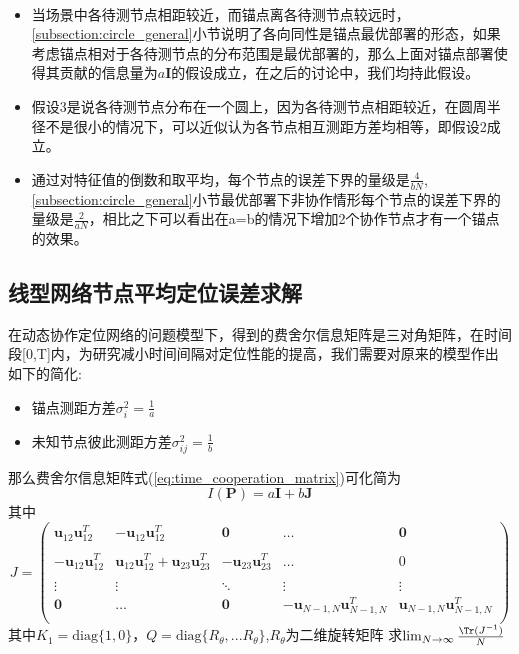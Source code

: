 \begin{remark}
~\\
\begin{itemize}
  \item 当场景中各待测节点相距较近，而锚点离各待测节点较远时，\ref{subsection:circle_general}小节说明了各向同性是锚点最优部署的形态，如果考虑锚点相对于各待测节点的分布范围是最优部署的，那么上面对锚点部署使得其贡献的信息量为$a\bm{I}$的假设成立，在之后的讨论中，我们均持此假设。
  \item 假设3是说各待测节点分布在一个圆上，因为各待测节点相距较近，在圆周半径不是很小的情况下，可以近似认为各节点相互测距方差均相等，即假设2成立。
  \item 通过对特征值的倒数和取平均，每个节点的误差下界的量级是$\frac{4}{bN}$,\ref{subsection:circle_general}小节最优部署下非协作情形每个节点的误差下界的量级是$\frac{2}{aN}$，相比之下可以看出在a=b的情况下增加2个协作节点才有一个锚点的效果。
\end{itemize}

\end{remark}
\subsection{线型网络节点平均定位误差求解}\label{subsection:linear_network}
在动态协作定位网络的问题模型下，得到的费舍尔信息矩阵是三对角矩阵，在时间段[0,T]内，为研究减小时间间隔对定位性能的提高，我们需要对原来的模型作出如下的简化:
\begin{itemize}
\item 锚点测距方差$\sigma_i^2=\frac{1}{a}$
\item 未知节点彼此测距方差$\sigma^2_{ij}=\frac{1}{b}$
\end{itemize}
那么费舍尔信息矩阵式(\ref{eq:time_cooperation_matrix})可化简为
\begin{equation}\label{eq:Pab}
I(\bm{P})=a\bm{I}+b\bm{J}
\end{equation}
其中\[
J=\left(
\begin{array}{ccccc}
\bm{u}_{12}\bm{u}_{12}^T&-\bm{u}_{12}\bm{u}_{12}^T&\bm{0}&\dots&\bm{0}\\
&&&&\\
-\bm{u}_{12}\bm{u}_{12}^T&\bm{u}_{12}\bm{u}_{12}^T+\bm{u}_{23}\bm{u}_{23}^T&-\bm{u}_{23}\bm{u}_{23}^T&\dots&0\\
&&&&\\
\vdots &\vdots&\ddots &\vdots&\vdots\\
\bm{0}&\dots&\bm{0}&-\bm{u}_{N-1,N}\bm{u}_{N-1,N}^T&\bm{u}_{N-1,N}\bm{u}_{N-1,N}^T\\
\end{array}
\right)
\]
其中$K_1=\text{diag}\{1,0\}$，$Q=\text{diag}\{R_{\theta},...R_{\theta}\}$,$R_{\theta}$为二维旋转矩阵
求$\lim_{N\to \infty}\frac{\Tr(J^{-1})}{N}$


